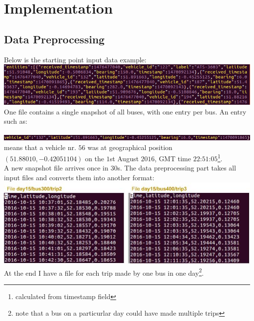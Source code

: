 \documentclass[12pt,a4paper,oneside,openright]{report}
\begin{document}
\chapter{Implementation}

\section{Data Preprocessing}

Below is the starting point input data example: \\
\includegraphics[width=\textwidth]{figs/starting_data.png} \\

One file contains a single snapshot of all buses, 
with one entry per bus. An entry such as:

\includegraphics[width=\textwidth]{figs/entry.png} \\

means that a vehicle nr. $56$ was at geographical position
$(51.88010, -0.42051104)$ on the $1$st August $2016$, GMT time
$22$:$51$:$05$\footnote{calculated from timestamp field}. \\

A new snapshot file arrives once in $30$s. The data preprocessing part
takes all input files and converts them into another format: \\

\includegraphics[width=\textwidth]{figs/converted_format.jpg} \\

At the end I have a file for each trip made by one bus in one
day\footnote{note that a bus on a particurlar day could have made
multiple trips}. \\
\end{document}
